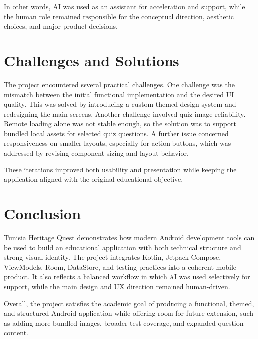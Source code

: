 \documentclass[12pt,a4paper]{article}
\begin{document}
In other words, AI was used as an assistant for acceleration and support, while the human role remained responsible for the conceptual direction, aesthetic choices, and major product decisions.

\section{Challenges and Solutions}
The project encountered several practical challenges. One challenge was the mismatch between the initial functional implementation and the desired UI quality. This was solved by introducing a custom themed design system and redesigning the main screens. Another challenge involved quiz image reliability. Remote loading alone was not stable enough, so the solution was to support bundled local assets for selected quiz questions. A further issue concerned responsiveness on smaller layouts, especially for action buttons, which was addressed by revising component sizing and layout behavior.

These iterations improved both usability and presentation while keeping the application aligned with the original educational objective.

\section{Conclusion}
Tunisia Heritage Quest demonstrates how modern Android development tools can be used to build an educational application with both technical structure and strong visual identity. The project integrates Kotlin, Jetpack Compose, ViewModels, Room, DataStore, and testing practices into a coherent mobile product. It also reflects a balanced workflow in which AI was used selectively for support, while the main design and UX direction remained human-driven.

Overall, the project satisfies the academic goal of producing a functional, themed, and structured Android application while offering room for future extension, such as adding more bundled images, broader test coverage, and expanded question content.
\end{document}
